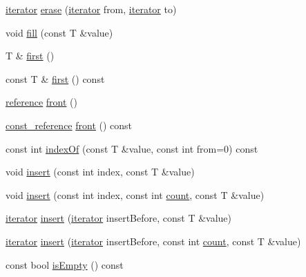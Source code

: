 \begin{DoxyCompactItemize}
\item 
\hyperlink{classprism_1_1_vector_aa547779173a63f6f8c9b2887498d10eb}{iterator} \hyperlink{classprism_1_1_vector_a170f8c53a09729cd04396604a982df59}{erase} (\hyperlink{classprism_1_1_vector_aa547779173a63f6f8c9b2887498d10eb}{iterator} from, \hyperlink{classprism_1_1_vector_aa547779173a63f6f8c9b2887498d10eb}{iterator} to)
\item 
void \hyperlink{classprism_1_1_vector_af9d17a636c708324bd373fb521da2941}{fill} (const T \&value)
\item 
T \& \hyperlink{classprism_1_1_vector_a1e2ec6951430f9850702ef7c95a13166}{first} ()
\item 
const T \& \hyperlink{classprism_1_1_vector_a5615ffd739ddca3ecadcc4357c4842c3}{first} () const 
\item 
\hyperlink{classprism_1_1_vector_a8ccf98342707efbed82918a44be97438}{reference} \hyperlink{classprism_1_1_vector_af37b66eb994e45fdaff93bc649a0561f}{front} ()
\item 
\hyperlink{classprism_1_1_vector_a75325487acaa0f63496c110e5a5632bb}{const\+\_\+reference} \hyperlink{classprism_1_1_vector_a3785411f25c191f68341fd8395d15440}{front} () const 
\item 
const int \hyperlink{classprism_1_1_vector_a0d0b833ffc1bc666624416e3b65181b4}{index\+Of} (const T \&value, const int from=0) const 
\item 
void \hyperlink{classprism_1_1_vector_aa9d6409134a4242f10ed6dbed1c5a91d}{insert} (const int index, const T \&value)
\item 
void \hyperlink{classprism_1_1_vector_a2712cf9aaa506332ae150e9e3f60abed}{insert} (const int index, const int \hyperlink{classprism_1_1_vector_ad40e1dc908502680797f37312dda7a4f}{count}, const T \&value)
\item 
\hyperlink{classprism_1_1_vector_aa547779173a63f6f8c9b2887498d10eb}{iterator} \hyperlink{classprism_1_1_vector_ac665dc2e7c506656fb4bbe3db303159c}{insert} (\hyperlink{classprism_1_1_vector_aa547779173a63f6f8c9b2887498d10eb}{iterator} insert\+Before, const T \&value)
\item 
\hyperlink{classprism_1_1_vector_aa547779173a63f6f8c9b2887498d10eb}{iterator} \hyperlink{classprism_1_1_vector_abbbb5974eb963ef66153271a4b6adf52}{insert} (\hyperlink{classprism_1_1_vector_aa547779173a63f6f8c9b2887498d10eb}{iterator} insert\+Before, const int \hyperlink{classprism_1_1_vector_ad40e1dc908502680797f37312dda7a4f}{count}, const T \&value)
\item 
const bool \hyperlink{classprism_1_1_vector_a23be1fddbb4bc27cabd6af5d1aa4ba91}{is\+Empty} () const 

\end{DoxyCompactItemize}
